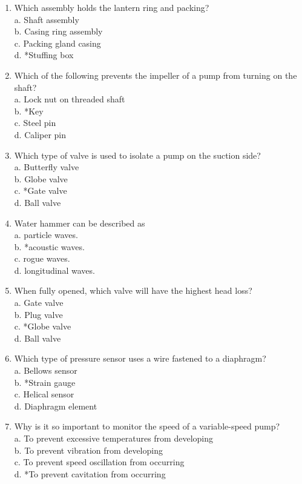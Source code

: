 \documentclass[10pt]{article}
\begin{document}
\begin{enumerate}
	\item Which assembly holds the lantern ring and packing?\\
a. Shaft assembly\\
b. Casing ring assembly\\
c. Packing gland casing\\
d. *Stuffing box

  \item Which of the following prevents the impeller of a pump from turning on the shaft?\\
a. Lock nut on threaded shaft\\
b. *Key\\
c. Steel pin\\
d. Caliper pin

  \item Which type of valve is used to isolate a pump on the suction side?\\
a. Butterfly valve\\
b. Globe valve\\
c. *Gate valve\\
d. Ball valve

  \item Water hammer can be described as\\
a. particle waves.\\
b. *acoustic waves.\\
c. rogue waves.\\
d. longitudinal waves.

  \item When fully opened, which valve will have the highest head loss?\\
a. Gate valve\\
b. Plug valve\\
c. *Globe valve\\
d. Ball valve

  \item Which type of pressure sensor uses a wire fastened to a diaphragm?\\
a. Bellows sensor\\
b. *Strain gauge\\
c. Helical sensor\\
d. Diaphragm element

  \item Why is it so important to monitor the speed of a variable-speed pump?\\
a. To prevent excessive temperatures from developing\\
b. To prevent vibration from developing\\
c. To prevent speed oscillation from occurring\\
d. *To prevent cavitation from occurring


\end{enumerate}
\end{document}

